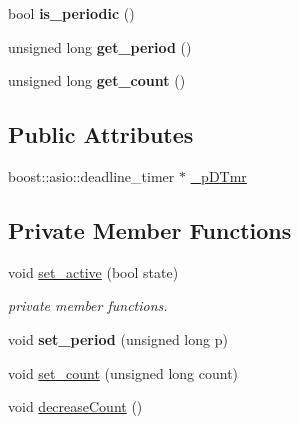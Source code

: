 \begin{DoxyCompactItemize}
\item 
\hypertarget{class_e_l_f_i_n_1_1_timer_task_a3aea432608054e6831edc8f224cf076b}{bool {\bfseries is\-\_\-periodic} ()}\label{class_e_l_f_i_n_1_1_timer_task_a3aea432608054e6831edc8f224cf076b}

\item 
\hypertarget{class_e_l_f_i_n_1_1_timer_task_ac8890dea124e1bc8eacd9dca2dad5ae2}{unsigned long {\bfseries get\-\_\-period} ()}\label{class_e_l_f_i_n_1_1_timer_task_ac8890dea124e1bc8eacd9dca2dad5ae2}

\item 
\hypertarget{class_e_l_f_i_n_1_1_timer_task_ac23d9073b9a8b5997f3175c958e20b0a}{unsigned long {\bfseries get\-\_\-count} ()}\label{class_e_l_f_i_n_1_1_timer_task_ac23d9073b9a8b5997f3175c958e20b0a}

\end{DoxyCompactItemize}
\subsection*{Public Attributes}
\begin{DoxyCompactItemize}
\item 
boost\-::asio\-::deadline\-\_\-timer $\ast$ \hyperlink{class_e_l_f_i_n_1_1_timer_task_a37355e38173dbba8a3cabe26bbe797bd}{\-\_\-p\-D\-Tmr}
\end{DoxyCompactItemize}
\subsection*{Private Member Functions}
\begin{DoxyCompactItemize}
\item 
void \hyperlink{class_e_l_f_i_n_1_1_timer_task_a119751683997f62a8ad228394b7476b5}{set\-\_\-active} (bool state)
\begin{DoxyCompactList}\small\item\em private member functions. \end{DoxyCompactList}\item 
\hypertarget{class_e_l_f_i_n_1_1_timer_task_a7240f6b7960d6f55204413261ffe8ee3}{void {\bfseries set\-\_\-period} (unsigned long p)}\label{class_e_l_f_i_n_1_1_timer_task_a7240f6b7960d6f55204413261ffe8ee3}

\item 
void \hyperlink{class_e_l_f_i_n_1_1_timer_task_a2d152a1ad35a5f5dfe4b7c05959f24ae}{set\-\_\-count} (unsigned long count)
\item 
void \hyperlink{class_e_l_f_i_n_1_1_timer_task_a404331c2599213942cd9deff62cc2e35}{decrease\-Count} ()
\end{DoxyCompactItemize}
